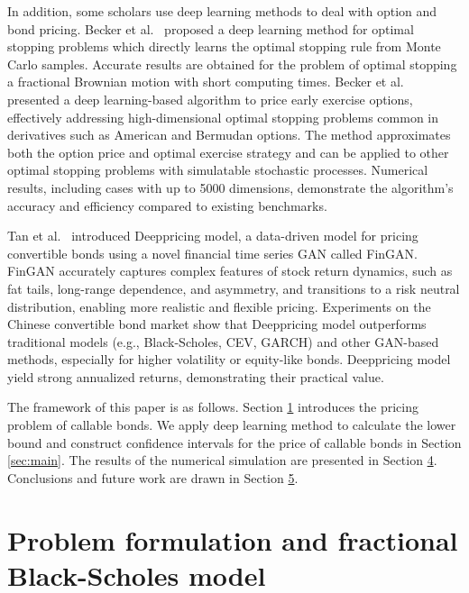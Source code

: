 \documentclass[10pt,a4paper]{amsart}
\numberwithin{equation}{section}
\begin{document}
In addition, some scholars use deep learning methods to deal with option and bond 
pricing.
Becker et al.\ \cite{becker2019deep} proposed a deep learning method for optimal 
stopping problems which directly learns the optimal stopping rule from Monte Carlo 
samples.
 Accurate results are obtained for the problem of optimal stopping
a fractional Brownian motion with short computing times.
Becker et al.\ \cite{becker2021solving} presented a deep learning-based algorithm 
to price early exercise options, effectively addressing high-dimensional optimal 
stopping problems common in derivatives such as American and Bermudan options. 
The method approximates both the option price and optimal exercise strategy and can be 
applied to other optimal stopping problems with simulatable stochastic processes. 
Numerical results, including cases with up to 5000 dimensions, demonstrate the 
algorithm's accuracy and efficiency compared to existing benchmarks.

Tan et al.\ \cite{tan2022deeppricing} introduced Deeppricing model, a data-driven model 
for pricing convertible bonds using a novel financial time series GAN called FinGAN. 
FinGAN accurately captures complex features of stock return dynamics, such as fat tails, 
long-range dependence, and asymmetry, and transitions to a risk neutral distribution, 
enabling more realistic and flexible pricing. Experiments on the Chinese convertible 
bond market show that Deeppricing model outperforms traditional models (e.g., 
Black-Scholes, CEV, GARCH) and other GAN-based methods, especially for higher 
volatility or equity-like bonds. %
Deeppricing model yield strong annualized returns, demonstrating their practical value.

The framework of this paper is as follows. 
Section \ref{sec:basics} introduces the pricing problem of callable bonds. 
We apply deep learning method to calculate the lower bound and construct confidence 
intervals for the price of callable bonds in Section \ref{sec:main}. 
The results of the numerical simulation are presented in Section \href{https://ejde.math.txstate.edu/Volumes/2026/09/han.pdf}{4}.
Conclusions and future work are drawn in Section \href{https://ejde.math.txstate.edu/Volumes/2026/09/han.pdf}{5}.


\section{Problem formulation and fractional Black-Scholes model}
\label{sec:basics}
\end{document}
